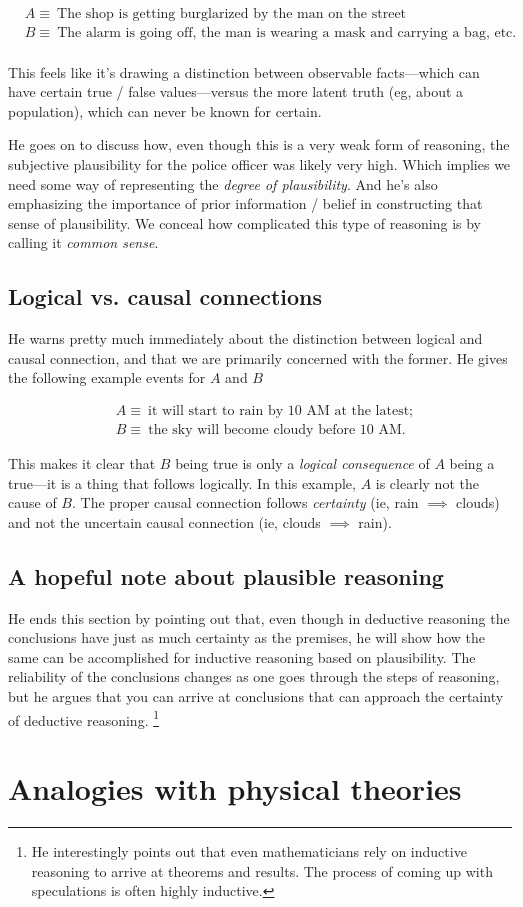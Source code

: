 \begin{align*}
    & A \equiv~\text{The shop is getting burglarized by the man on the street}\\
    & B \equiv~\text{The alarm is going off, the man is wearing a mask and carrying a bag,
    etc.}
\end{align*}
\\
\noindent This feels like it's drawing a distinction between observable facts---which can
have certain true / false values---versus the more latent truth (eg, about a population),
which can never be known for certain.

He goes on to discuss how, even though this is a very weak form of reasoning, the
subjective plausibility for the police officer was likely very high. Which implies we need
some way of representing the \emph{degree of plausibility}. And he's also emphasizing the
importance of prior information / belief in constructing that sense of plausibility. We
conceal how complicated this type of reasoning is by calling it \emph{common sense}.

\subsection{Logical vs. causal connections}

He warns pretty much immediately about the distinction between logical and causal
connection, and that we are primarily concerned with the former. He gives the following
example events for $A$ and $B$

\begin{align*}
    & A \equiv~\text{it will start to rain by 10 AM at the latest};\\
    & B \equiv~\text{the sky will become cloudy before 10 AM.}
\end{align*}

\noindent This makes it clear that $B$ being true is only a \emph{logical consequence} of
$A$ being a true---it is a thing that follows logically. In this example, $A$ is clearly
not the cause of $B$. The proper causal connection follows \emph{certainty} (ie, rain
$\implies$ clouds) and not the uncertain causal connection (ie, clouds $\implies$ rain).

\subsection{A hopeful note about plausible reasoning}

He ends this section by pointing out that, even though in deductive reasoning the
conclusions have just as much certainty as the premises, he will show how the same can be
accomplished for inductive reasoning based on plausibility. The reliability of the
conclusions changes as one goes through the steps of reasoning, but he argues that you can
arrive at conclusions that can approach the certainty of deductive reasoning. \footnote{He
    interestingly points out that even mathematicians rely on inductive reasoning to
    arrive at theorems and results. The process of coming up with speculations is often
highly inductive.}

\section{Analogies with physical theories}
